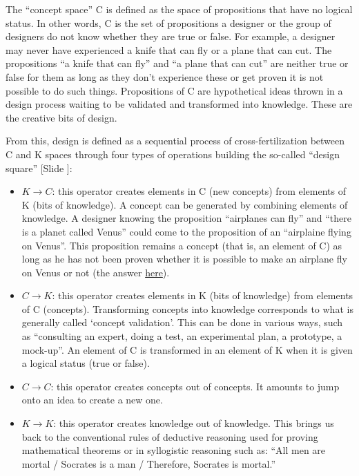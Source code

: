\documentclass{article}
\newcounter{slide}
\begin{document}
The ``concept space'' C is defined as the space of propositions that have no logical status. In other words, C is the set of propositions a designer or the group of designers do not know whether they are true or false. For example, a designer may never have experienced a knife that can fly or a plane that can cut. The propositions ``a knife that can fly'' and ``a plane that can cut'' are neither true or false for them as long as they don't experience these or get proven it is not possible to do such things. Propositions of C are hypothetical ideas thrown in a design process waiting to be validated and transformed into knowledge. These are the creative bits of design. 

From this, design is defined as a sequential process of cross-fertilization between C and K spaces through four types of operations building the so-called ``design square'' {\color{blue}[Slide ]}:
\begin{itemize}
	\item $K\rightarrow C$: this operator creates elements in C (new concepts) from elements of K (bits of knowledge). A concept can be generated by combining elements of knowledge. A designer knowing the proposition ``airplanes can fly'' and ``there is a planet called Venus'' could come to the proposition of an ``airplaine flying on Venus''. This proposition remains a concept (that is, an element of C) as long as he has not been proven whether it is possible to make an airplane fly on Venus or not (the answer \href{https://whatif.xkcd.com/book/}{here}).
	\item $C\rightarrow K$: this operator creates elements in K (bits of knowledge) from elements of C (concepts). Transforming concepts into knowledge corresponds to what is generally called `concept validation'. This can be done in various ways, such as ``consulting an expert, doing a test, an experimental plan, a prototype, a mock-up''. An element of C is transformed in an element of K when it is given a logical status (true or false).
	\item $C\rightarrow C$: this operator creates concepts out of concepts. It amounts to jump onto an idea to create a new one.
	\item $K\rightarrow K$: this operator creates knowledge out of knowledge. This brings us back to the conventional rules of deductive reasoning used for proving mathematical theorems or in syllogistic reasoning such as: ``All men are mortal / Socrates is a man / Therefore, Socrates is mortal.'' 
\end{itemize}
\end{document}
